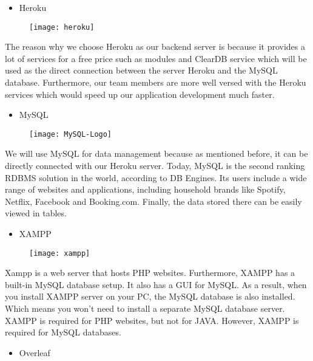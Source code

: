 \documentclass[conference]{IEEEtran}
\begin{document}
\begin{itemize}
\item Heroku
\end{itemize}
\par \begin{figure}[h!]
\texttt{[image: heroku]}
\centering
\end{figure} The reason why we choose Heroku as our backend server is because it provides a lot of services for a free price such as modules and ClearDB service which will be used as the direct connection between the server Heroku and the MySQL database. Furthermore, our team members are more well versed with the Heroku services which would speed up our application development much faster.\\
\begin{itemize}
\item MySQL
\end{itemize}
\par \begin{figure}[h!]
\texttt{[image: MySQL-Logo]}
\centering
\end{figure}We will use MySQL for data management because as mentioned before, it can be directly connected with our Heroku server. Today, MySQL is the second ranking RDBMS solution in the world, according to DB Engines. Its users include a wide range of websites and applications, including household brands like Spotify, Netflix, Facebook and Booking.com. Finally, the data stored there can be easily viewed in tables.\\
\begin{itemize}
\item XAMPP
\end{itemize}
\par \begin{figure}[h!]
\texttt{[image: xampp]}
\centering
\end{figure} Xampp is a web server that hosts PHP websites. Furthermore, XAMPP has a built-in MySQL database setup. It also has a GUI for MySQL. As a result, when you install XAMPP server on your PC, the MySQL database is also installed. Which means you won't need to install a separate MySQL database server. XAMPP is required for PHP websites, but not for JAVA. However, XAMPP is required for MySQL databases.\\
\begin{itemize}
\item Overleaf
\end{itemize}
\end{document}
